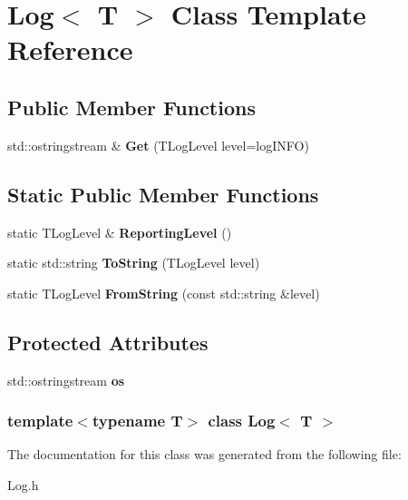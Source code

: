 \hypertarget{classLog}{\section{\-Log$<$ \-T $>$ \-Class \-Template \-Reference}
\label{classLog}
}
\subsection*{\-Public \-Member \-Functions}
\begin{DoxyCompactItemize}
\item 
\hypertarget{classLog_af1e91af54d9f85caaa661f794b37bffb}{std\-::ostringstream \& {\bfseries \-Get} (\-T\-Log\-Level level=log\-I\-N\-F\-O)}\label{classLog_af1e91af54d9f85caaa661f794b37bffb}

\end{DoxyCompactItemize}
\subsection*{\-Static \-Public \-Member \-Functions}
\begin{DoxyCompactItemize}
\item 
\hypertarget{classLog_a7e74a1454fd3d52a408eaa1c04ab4d23}{static \-T\-Log\-Level \& {\bfseries \-Reporting\-Level} ()}\label{classLog_a7e74a1454fd3d52a408eaa1c04ab4d23}

\item 
\hypertarget{classLog_aa889a30fd8ee83904e193ec5e9446216}{static std\-::string {\bfseries \-To\-String} (\-T\-Log\-Level level)}\label{classLog_aa889a30fd8ee83904e193ec5e9446216}

\item 
\hypertarget{classLog_a684966272ade00c32c6e9744eb6b3e9c}{static \-T\-Log\-Level {\bfseries \-From\-String} (const std\-::string \&level)}\label{classLog_a684966272ade00c32c6e9744eb6b3e9c}

\end{DoxyCompactItemize}
\subsection*{\-Protected \-Attributes}
\begin{DoxyCompactItemize}
\item 
\hypertarget{classLog_a01de1c92999fe0c55e5b4a50ffe02336}{std\-::ostringstream {\bfseries os}}\label{classLog_a01de1c92999fe0c55e5b4a50ffe02336}

\end{DoxyCompactItemize}
\subsubsection*{template$<$typename \-T$>$ class Log$<$ T $>$}



\-The documentation for this class was generated from the following file\-:\begin{DoxyCompactItemize}
\item 
\-Log.\-h\end{DoxyCompactItemize}
